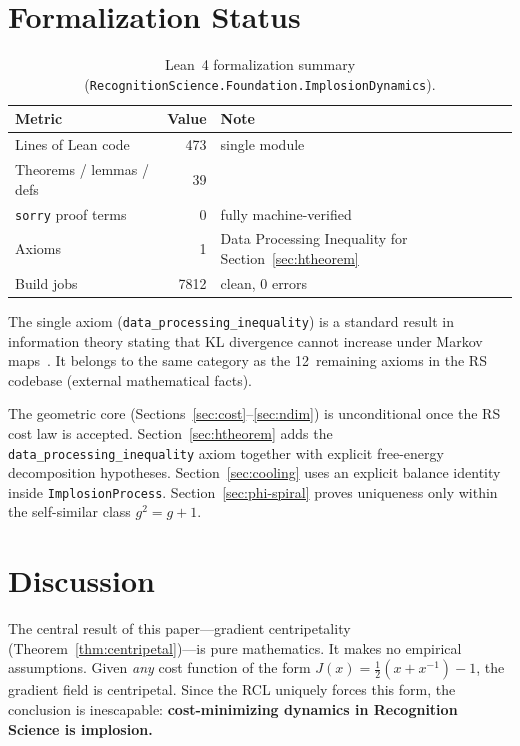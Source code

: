 \documentclass[11pt,a4paper]{article}
\theoremstyle{definition}
\newcommand{\Jc}{J}
\newcommand{\code}[1]{\texttt{\small #1}}
\begin{document}
\section{Formalization Status}
\label{sec:lean}

\begin{table}[ht]
\centering
\caption{Lean~4 formalization summary
  (\code{RecognitionScience.Foundation.ImplosionDynamics}).}
\label{tab:lean}
\begin{tabular}{lrl}
\toprule
\textbf{Metric} & \textbf{Value} & \textbf{Note} \\
\midrule
Lines of Lean code & 473 & single module \\
Theorems / lemmas / defs & 39 & \\
\texttt{sorry} proof terms & 0 & fully machine-verified \\
Axioms & 1 & Data Processing Inequality for Section~\ref{sec:htheorem} \\
Build jobs & 7812 & clean, 0 errors \\
\bottomrule
\end{tabular}
\end{table}

The single axiom (\code{data\_processing\_inequality}) is a standard
result in information theory stating that KL divergence cannot increase
under Markov maps~\cite{CoverThomas2006}.  It belongs to the same
category as the 12~remaining axioms in the RS codebase (external
mathematical facts).

The geometric core (Sections~\ref{sec:cost}--\ref{sec:ndim}) is unconditional
once the RS cost law is accepted.  Section~\ref{sec:htheorem} adds the
\code{data\_processing\_inequality} axiom together with explicit free-energy
decomposition hypotheses.  Section~\ref{sec:cooling} uses an explicit balance
identity inside \code{ImplosionProcess}.  Section~\ref{sec:phi-spiral} proves
uniqueness only within the self-similar class $g^2 = g + 1$.

\section{Discussion}
\label{sec:discussion}

The central result of this paper---gradient centripetality
(Theorem~\ref{thm:centripetal})---is pure mathematics.  It makes no
empirical assumptions.  Given \emph{any} cost function of the form
$\Jc(x) = \tfrac{1}{2}(x + x^{-1}) - 1$, the gradient field is
centripetal.  Since the RCL uniquely forces this form, the conclusion
is inescapable: \textbf{cost-minimizing dynamics in Recognition Science
is implosion.}
\end{document}
